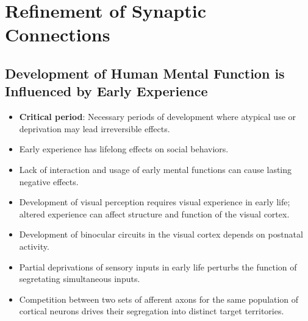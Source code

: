 \documentclass[12pt,a4paper]{article}
\begin{document}
\clearpage
\section{Refinement of Synaptic Connections}
\subsection{Development of Human Mental Function is Influenced by Early Experience}
\begin{itemize}
    \item \textbf{Critical period}: Necessary periods of development where atypical use or deprivation may lead irreversible effects. 
    \item Early experience has lifelong effects on social behaviors.
    \item Lack of interaction and usage of early mental functions can cause lasting negative effects.
    \item Development of visual perception requires visual experience in early life; altered experience can affect structure and function of the visual cortex.
    \item Development of binocular circuits in the visual cortex depends on postnatal activity.
    \item Partial deprivations of sensory inputs in early life perturbs the function of segretating simultaneous inputs.
    \item Competition between two sets of afferent axons for the same population of cortical neurons drives their segregation into distinct target territories.
\end{itemize}
\end{document}

